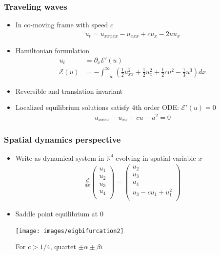 \documentclass[16pt]{beamer}
\begin{document}
\begin{frame}
	\frametitle{Traveling waves}
	\begin{itemize}
		\item In co-moving frame with speed $c$
		\begin{align*} 
		u_t = u_{xxxxx} - u_{xxx} + c u_x - 2 u u_x
		\end{align*}

		\item Hamiltonian formulation
		\begin{align*} 
			u_t &= \partial_x \mathcal{E}'(u) \\
			\mathcal{E}(u) &= -\int_{-\infty}^{\infty} \left( \frac{1}{2}u_{xx}^2 + \frac{1}{2}u_x^2 + \frac{1}{2}cu^2 - \frac{1}{3}u^3 \right) dx 
		\end{align*}

		\item Reversible and translation invariant

		\item Localized equilibrium solutions satisfy 4th order ODE: $\mathcal{E}'(u) = 0$
		\begin{align*} 
		u_{xxxx} - u_{xx} + cu - u^2 = 0
		\end{align*}
	\end{itemize}
\end{frame}


\begin{frame}
	\frametitle{Spatial dynamics perspective}
	\begin{itemize}
		\item Write as dynamical system in $\mathbb{R}^4$ evolving in spatial variable $x$
		\begin{align*}
		\frac{d}{dx}\begin{pmatrix}u_1 \\ u_2 \\ u_3 \\ u_4 \\ \end{pmatrix} =
		\begin{pmatrix}u_2 \\ u_3 \\ u_4 \\ u_3 - c u_1 + u_1^2  \\ \end{pmatrix}
		\end{align*}
		\item Saddle point equilibrium at 0
		\begin{center}
		\texttt{[image: images/eigbifurcation2]}
		\end{center}
		For $c > 1/4$, quartet $\pm \alpha \pm \beta i$
	\end{itemize}
\end{frame}
\end{document}

